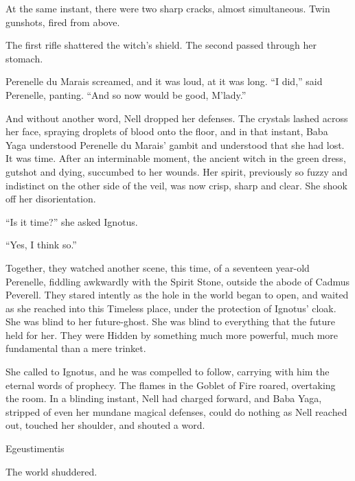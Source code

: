 At the same instant, there were two sharp cracks, almost simultaneous. Twin gunshots, fired from above.

The first rifle shattered the witch’s shield. The second passed through her stomach.

Perenelle du Marais screamed, and it was loud, at it was long.
\simpleline
“I did,” said Perenelle, panting. “And so now would be good, M’lady.”

And without another word, Nell dropped her defenses. The crystals lashed across her face, spraying droplets of blood onto the floor, and in that instant, Baba Yaga understood Perenelle du Marais’ gambit and understood that she had lost.
\simpleline
It was time. After an interminable moment, the ancient witch in the green dress, gutshot and dying, succumbed to her wounds. Her spirit, previously so fuzzy and indistinct on the other side of the veil, was now crisp, sharp and clear. She shook off her disorientation.

“Is it time?” she asked Ignotus.

“Yes, I think so.”

Together, they watched another scene, this time, of a seventeen year-old Perenelle, fiddling awkwardly with the Spirit Stone, outside the abode of Cadmus Peverell. They stared intently as the hole in the world began to open, and waited as she reached into this Timeless place, under the protection of Ignotus’ cloak. She was blind to her future-ghost. She was blind to everything that the future held for her. They were Hidden by something much more powerful, much more fundamental than a mere trinket.

She called to Ignotus, and he was compelled to follow, carrying with him the eternal words of prophecy.
\simpleline
The flames in the Goblet of Fire roared, overtaking the room. In a blinding instant, Nell had charged forward, and Baba Yaga, stripped of even her mundane magical defenses, could do nothing as Nell reached out, touched her shoulder, and shouted a word.

Egeustimentis

The world shuddered.
